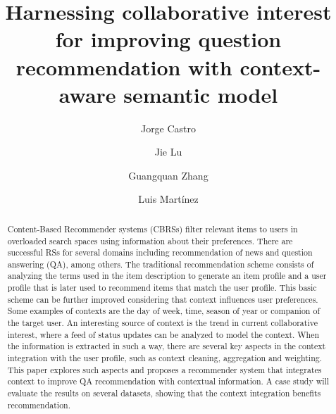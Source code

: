 \documentclass[preprint]{elsarticle}
\begin{document}
\title{Harnessing collaborative interest for improving question recommendation with context-aware semantic model}

\begin{spacing}{1.5}

\begin{frontmatter}

\author[addressjorge,addressjie]{Jorge Castro}

\author[addressjie]{Jie Lu}

\author[addressjie]{Guangquan Zhang}

\author[addressluis]{Luis Mart\'inez}

\address[addressjorge]{Department of Computer Science and Artificial Intelligence, University of Granada, Granada (Spain)}
\address[addressjie]{School of Software, University of Technology Sydney, Sydney (Australia)}
\address[addressluis]{Computer Science Department, University of Ja\'en, Ja\'en (Spain)}

\begin{abstract}

Content-Based Recommender systems (CBRSs) filter relevant items to users in overloaded search spaces using information about their preferences. There are successful RSs for several domains including recommendation of news and question answering (QA), among others. The traditional recommendation scheme consists of analyzing the terms used in the item description to generate an item profile and a user profile that is later used to recommend items that match the user profile. This basic scheme can be further improved considering that context influences user preferences. Some examples of contexts are the day of week, time, season of year or companion of the target user. An interesting source of context is the trend in current collaborative interest, where a feed of status updates can be analyzed to model the context. When the information is extracted in such a way, there are several key aspects in the context integration with the user profile, such as context cleaning, aggregation and weighting. This paper explores such aspects and proposes a recommender system that integrates context to improve QA recommendation with contextual information. A case study will evaluate the results on several datasets, showing that the context integration benefits recommendation.


\end{abstract}
\end{frontmatter}
\end{spacing}
\end{document}
